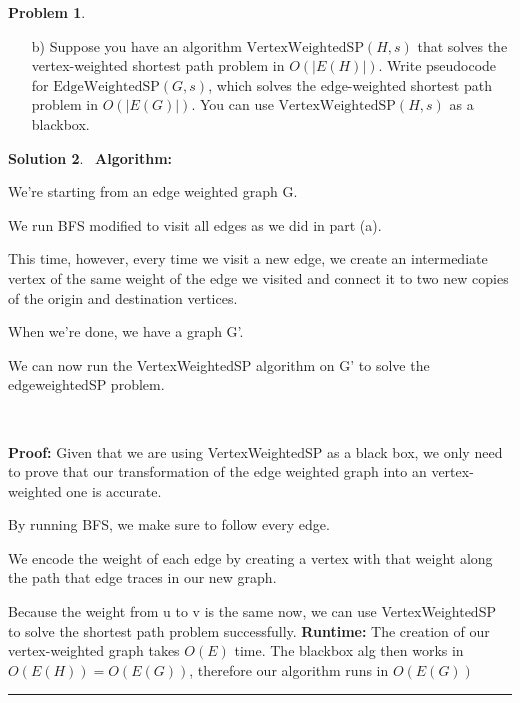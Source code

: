 \documentclass{article}
\theoremstyle{definition}
\newtheorem{problem}{Problem}
\def\fline{\rule{0.75\linewidth}{0.5pt}}
\newcommand{\finishline}{\begin{center}\fline\end{center}}
\newtheorem*{solution*}{Solution}
\newenvironment{solution}{\begin{solution*}}{{\finishline} \end{solution*}}
\begin{document}
\begin{problem}
\begin{enumerate}
\begin{solution}
    Because this is the same, now the edgeweightedSP function can solve the vertex weight problem. All we need to do at the end is add the weight of the origin vertex, which gets lost in the conversion to an edge weighted graph

    \textbf{Runtime:}
    The creation of our edge graph from our vertex graph takes $O(E)$ time. The blackbox alg then works in $O(E(G)) = O(E(H))$, therefore our algorithm runs in $O(E(H))$
\end{solution}

\newpage




\item[b)] 
Suppose you have an algorithm \( \text{VertexWeightedSP}(H, s) \) that solves the vertex-weighted shortest path problem in \( O(|E(H)|) \). Write pseudocode for \( \text{EdgeWeightedSP}(G, s) \), which solves the edge-weighted shortest path problem in \( O(|E(G)|) \). You can use \( \text{VertexWeightedSP}(H, s) \) as a blackbox.

\end{enumerate}

\end{problem}


\begin{solution}

    \
    \textbf{Algorithm: }
    \
    
    We're starting from an edge weighted graph G.
    
    We run BFS modified to visit all edges as we did in part (a).

    This time, however, every time we visit a new edge, we create an intermediate vertex of the same weight of the edge we visited and connect it to two new copies of the origin and destination vertices.

    When we're done, we have a graph G'.

    We can now run the VertexWeightedSP algorithm on G' to solve the edgeweightedSP problem.

    \

    \textbf{Proof:}
    Given that we are using VertexWeightedSP as a black box, we only need to prove that our transformation of the edge weighted graph into an vertex-weighted one is accurate.
    \

    By running BFS, we make sure to follow every edge.

    We encode the weight of each edge by creating a vertex with that weight along the path that edge traces in our new graph.

    Because the weight from u to v is the same now, we can use VertexWeightedSP to solve the shortest path problem successfully.
    \textbf{Runtime:}
    The creation of our vertex-weighted graph takes $O(E)$ time. The blackbox alg then works in $O(E(H)) = O(E(G))$, therefore our algorithm runs in $O(E(G))$
\end{solution}
\end{document}
